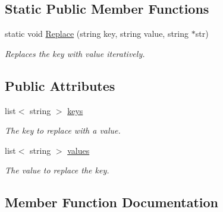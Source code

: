 \subsection*{Static Public Member Functions}
\begin{DoxyCompactItemize}
\item 
static void \hyperlink{classnix_1_1FillTemplate_a598186c0e5d598438fbb60f7a55f3560}{Replace} (string key, string value, string $\ast$str)
\begin{DoxyCompactList}\small\item\em Replaces the key with value iteratively. \end{DoxyCompactList}\end{DoxyCompactItemize}
\subsection*{Public Attributes}
\begin{DoxyCompactItemize}
\item 
\mbox{\label{classnix_1_1FillTemplate_a7aa30d8bf0e672c2ee213b2909b04094}} 
list$<$ string $>$ \hyperlink{classnix_1_1FillTemplate_a7aa30d8bf0e672c2ee213b2909b04094}{keys}
\begin{DoxyCompactList}\small\item\em The key to replace with a value. \end{DoxyCompactList}\item 
\mbox{\label{classnix_1_1FillTemplate_acb3cec66f645dc59847de0a8a48e4851}} 
list$<$ string $>$ \hyperlink{classnix_1_1FillTemplate_acb3cec66f645dc59847de0a8a48e4851}{values}
\begin{DoxyCompactList}\small\item\em The value to replace the key. \end{DoxyCompactList}\end{DoxyCompactItemize}


\subsection{Member Function Documentation}
\mbox{\label{classnix_1_1FillTemplate_a9f9cfbd663e5a02fa53ee8262d8950c4}} 
